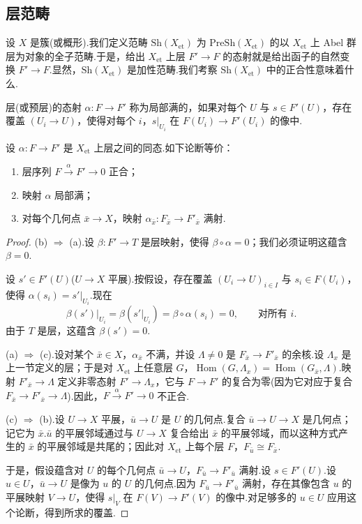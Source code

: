 \subsection*{层范畴}

设 $X$ 是簇(或概形).我们定义范畴 $\mathrm{Sh}(X_{\mathrm{et}})$ 为 $\mathrm{PreSh}(X_{\mathrm{et}})$ 的以 $X_{\mathrm{et}}$ 上 Abel 群层为对象的全子范畴.于是，给出 $X_{\mathrm{et}}$ 上层 $F' \to F$ 的态射就是给出函子的自然变换 $F' \to F$.显然，$\mathrm{Sh}(X_{\mathrm{et}})$ 是加性范畴.我们考察 $\mathrm{Sh}(X_{\mathrm{et}})$ 中的正合性意味着什么.

层(或预层)的态射 $\alpha \colon F \to F'$ 称为局部满的，如果对每个 $U$ 与 $s \in F'(U)$，存在覆盖 $(U_i \to U)$，使得对每个 $i$，$s|_{U_i}$ 在 $F(U_i) \to F'(U_i)$ 的像中.

\begin{lemma}\label{lem:7.4}
设 $\alpha \colon F \to F'$ 是 $X_{\mathrm{et}}$ 上层之间的同态.如下论断等价：
\begin{enumerate}
  \item 层序列 $F \xrightarrow{\alpha} F' \to 0$ 正合；
  \item 映射 $\alpha$ 局部满；
  \item 对每个几何点 $\bar{x} \to X$，映射 $\alpha_{\bar{x}} \colon F_{\bar{x}} \to F'_{\bar{x}}$ 满射.
\end{enumerate}
\end{lemma}

\begin{proof}
(b) $\Rightarrow$ (a).设 $\beta \colon F' \to T$ 是层映射，使得 $\beta \circ \alpha = 0$；我们必须证明这蕴含 $\beta = 0$.

设 $s' \in F'(U)$($U \to X$ 平展).按假设，存在覆盖 $(U_i \to U)_{i \in I}$ 与 $s_i \in F(U_i)$，使得 $\alpha(s_i) = s'|_{U_i}$.现在
\[
\beta(s')|_{U_i} = \beta(s'|_{U_i}) = \beta \circ \alpha(s_i) = 0, \qquad \text{对所有 } i.
\]
由于 $T$ 是层，这蕴含 $\beta(s') = 0$.

(a) $\Rightarrow$ (c).设对某个 $\bar{x} \in X$，$\alpha_{\bar{x}}$ 不满，并设 $\Lambda \neq 0$ 是 $F_{\bar{x}} \to F'_{\bar{x}}$ 的余核.设 $\Lambda_x$ 是上一节定义的层；于是对 $X_{\mathrm{et}}$ 上任意层 $G$，$\operatorname{Hom}(G, \Lambda_x) = \operatorname{Hom}(G_{\bar{x}}, \Lambda)$.映射 $F'_{\bar{x}} \to \Lambda$ 定义非零态射 $F' \to \Lambda_x$，它与 $F \to F'$ 的复合为零(因为它对应于复合 $F_{\bar{x}} \to F'_{\bar{x}} \to \Lambda$).因此，$F \xrightarrow{\alpha} F' \to 0$ 不正合.

(c) $\Rightarrow$ (b).设 $U \to X$ 平展，$\bar{u} \to U$ 是 $U$ 的几何点.复合 $\bar{u} \to U \to X$ 是几何点；记它为 $\bar{x}$.$\bar{u}$ 的平展邻域通过与 $U \to X$ 复合给出 $\bar{x}$ 的平展邻域，而以这种方式产生的 $\bar{x}$ 的平展邻域是共尾的；因此对 $X_{\mathrm{et}}$ 上每个层 $F$，$F_{\bar{u}} \cong F_{\bar{x}}$.

于是，假设蕴含对 $U$ 的每个几何点 $\bar{u} \to U$，$F_{\bar{u}} \to F'_{\bar{u}}$ 满射.设 $s \in F'(U)$.设 $u \in U$，$\bar{u} \to U$ 是像为 $u$ 的 $U$ 的几何点.因为 $F_{\bar{u}} \to F'_{\bar{u}}$ 满射，存在其像包含 $u$ 的平展映射 $V \to U$，使得 $s|_{V}$ 在 $F(V) \to F'(V)$ 的像中.对足够多的 $u \in U$ 应用这个论断，得到所求的覆盖.
\end{proof}

